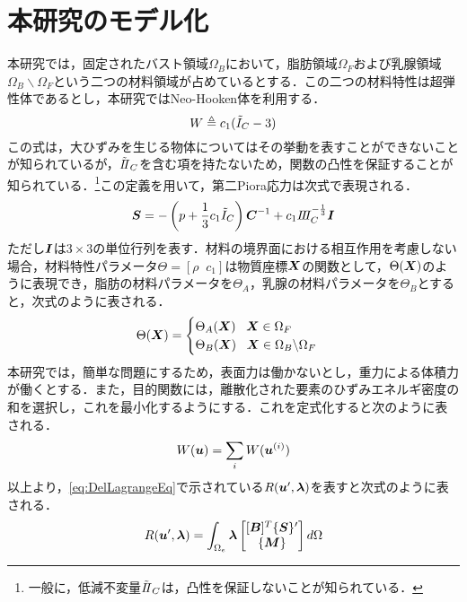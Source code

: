 \section{本研究のモデル化}
	本研究では，固定されたバスト領域$ \Omega_B $において，脂肪領域$ \Omega_F $および乳腺領域$ \Omega_B \backslash \Omega_F $という二つの材料領域が占めているとする．この二つの材料特性は超弾性体であるとし，本研究ではNeo-Hooken体を利用する．
	\begin{equation}\label{eq:NeoHookeDef}
		W \triangleq c_1(\tilde{I}_C - 3)
	\end{equation}
	この式は，大ひずみを生じる物体についてはその挙動を表すことができないことが知られているが，$ \tilde{I\hspace{-.2em}I}_C $を含む項を持たないため，関数の凸性を保証することが知られている．\footnote{一般に，低減不変量$\tilde{I\hspace{-.2em}I}_C$は，凸性を保証しないことが知られている．}この定義を用いて，第二Piora応力は次式で表現される．
	\begin{equation}\label{eq:NeoHookeStrain}
		{\mbox{\boldmath $S$}} = -\left(p+\frac{1}{3} c_1 \tilde{I}_C \right) {\mbox{\boldmath $C$}}^{-1} + c_1 I\hspace{-.2em}I\hspace{-.2em}I_C^{-\frac{1}{3}} {\mbox{\boldmath $I$}}
	\end{equation}
	ただし$ {\mbox{\boldmath $I$}} $は$ 3 \times 3 $の単位行列を表す．材料の境界面における相互作用を考慮しない場合，材料特性パラメータ$ \Theta = [\rho \;\; c_1] $は物質座標$ {\mbox{\boldmath $X$}} $の関数として，$ \Theta({\mbox{\boldmath $X$}}) $のように表現でき，脂肪の材料パラメータを$ \Theta_A $，乳腺の材料パラメータを$ \Theta_B $とすると，次式のように表される．
	\begin{equation}\label{eq:ParamEq}
		\Theta({\mbox{\boldmath $X$}}) = \begin{cases} 
		\Theta_A({\mbox{\boldmath $X$}}) \;\;\; {\mbox{\boldmath $X$}} \in \Omega_F \\
		\Theta_B({\mbox{\boldmath $X$}}) \;\;\; {\mbox{\boldmath $X$}} \in \Omega_B \backslash \Omega_F 
		\end{cases}
	\end{equation}
	本研究では，簡単な問題にするため，表面力は働かないとし，重力による体積力が働くとする．また，目的関数には，離散化された要素のひずみエネルギ密度の和を選択し，これを最小化するようにする．これを定式化すると次のように表される．
	\begin{equation}\label{eq:DivSumEnergyDensity}
		W({\mbox{\boldmath $u$}}) = \sum_{i} W({\mbox{\boldmath $u$}}^{(i)})
	\end{equation}
	以上より，\eqref{eq:DelLagrangeEq}で示されている$ R({\mbox{\boldmath $u$}}',{\mbox{\boldmath $\lambda$}}) $を表すと次式のように表される．
	\begin{equation}\label{eq:R_NeoHookeEq}
		R({\mbox{\boldmath $u$}}',{\mbox{\boldmath $\lambda$}}) =  \int_{\Omega_e} {\mbox{\boldmath $\lambda$}} \left[ \begin{matrix}
		[{\mbox{\boldmath $B$}}]^T \{{\mbox{\boldmath $S$}} \}' \\ \{ {\mbox{\boldmath $M$}} \}
		\end{matrix}\right] d\Omega 
	\end{equation}
